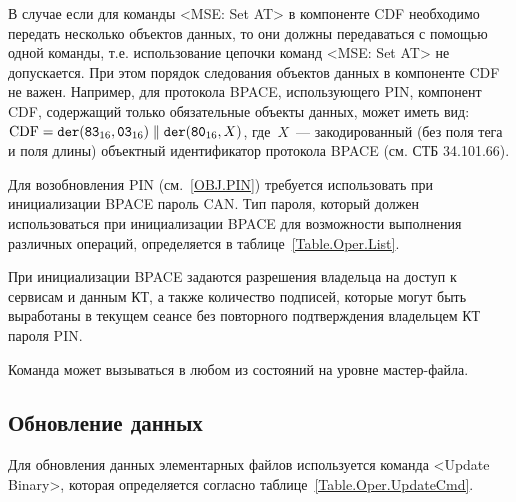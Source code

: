 В случае если для команды <MSE: Set AT> в компоненте CDF необходимо 
передать несколько объектов данных, то они должны передаваться с помощью 
одной команды, т.е. использование цепочки команд <MSE: Set AT> не 
допускается. При этом порядок следования объектов данных в компоненте CDF 
не важен. Например, для протокола BPACE, использующего PIN, компонент CDF, 
содержащий только обязательные объекты данных, может иметь вид: 
$\text{CDF} = 
\texttt{der}(\texttt{83}_{16}, \texttt{03}_{16}) \parallel 
\texttt{der}(\texttt{80}_{16}, X)$, где~$X$~--- закодированный (без поля тега и 
поля длины) объектный идентификатор протокола BPACE (см. СТБ 34.101.66). 


Для возобновления PIN (см.~\ref{OBJ.PIN}) требуется 
использовать при инициализации BPACE пароль CAN. 
Тип пароля, который должен использоваться при 
инициализации BPACE для возможности выполнения различных 
операций, определяется в таблице~\ref{Table.Oper.List}.

При инициализации BPACE задаются разрешения 
владельца на доступ к сервисам и данным  
КТ, а также количество подписей, которые могут быть выработаны 
в текущем сеансе без повторного 
подтверждения владельцем КТ пароля PIN.

Команда может вызываться в любом из состояний на уровне мастер-файла.


\subsection{Обновление данных}
\label{Oper.Descr.Update}

Для обновления данных элементарных файлов используется
команда <Update Binary>, 
которая определяется согласно 
таблице~\ref{Table.Oper.UpdateCmd}.

